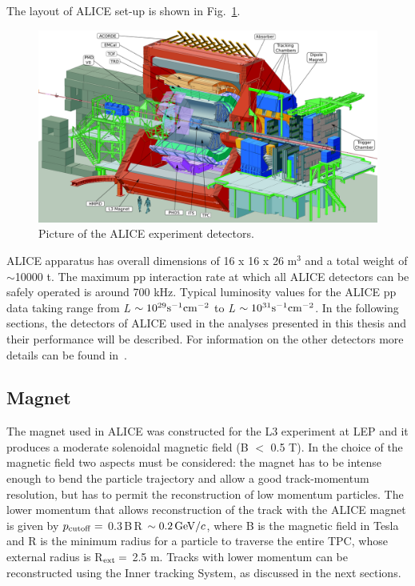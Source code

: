 The layout of ALICE set-up is shown in Fig.~\ref{fig:imageALICE}. 
\begin{figure}[!t]
\centering
\includegraphics[width=12cm]{FigCap3/alice.png}
\caption{Picture of the ALICE experiment detectors.}
\label{fig:imageALICE}
\end{figure}
ALICE apparatus has overall dimensions of 16 x 16 x 26 m$^3$ and a total 
weight of $\sim$10000 t. The maximum pp interaction rate at which all ALICE 
detectors can be safely operated is around 700 kHz. Typical luminosity values 
for the ALICE pp data taking range from \textit{L} $\sim 10^{29}{\rm s}^{-1}{\rm cm}^{-2}$ 
to \textit{L} $\sim 10^{31}{\rm s}^{-1}{\rm cm}^{-2}$.
In the following sections, the detectors of ALICE used in the analyses presented in this thesis and their 
performance will be described. For information on the other detectors more details can be found in~\cite{Aamodt:2008zz}.

\subsection{Magnet}
The magnet used in ALICE was constructed for the L3 experiment at LEP and 
it produces a moderate solenoidal magnetic field (B $<$ 0.5 T). In the choice 
of the magnetic field two aspects must be considered: the magnet has to be intense 
enough to bend the particle trajectory and allow a good track-momentum resolution, 
but has to permit the reconstruction of low 
momentum particles. The lower momentum that allows reconstruction of the track 
with the ALICE magnet is given by $p_{\rm cutoff}=$ 0.3$\,$B$\,$R $\sim 0.2\,\mathrm{GeV}/c$, 
where B is the magnetic field in Tesla and R is the minimum radius for a particle to 
traverse the entire TPC, whose external radius is R$_{\rm ext}=$ 2.5 m.
Tracks with lower momentum can be reconstructed using the Inner tracking System, as discussed
in the next sections.


